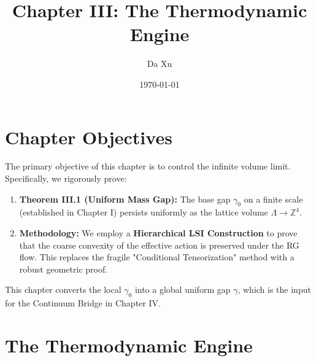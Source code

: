 \documentclass[11pt,a4paper]{report}
\title{Chapter III: The Thermodynamic Engine}
\author{Da Xu}
\date{\today}
\begin{document}
\maketitle

\chapter*{Chapter Objectives}
The primary objective of this chapter is to control the infinite volume limit. Specifically, we rigorously prove:
\begin{enumerate}
    \item \textbf{Theorem III.1 (Uniform Mass Gap):} The base gap $\gamma_0$ on a finite scale (established in Chapter I) persists uniformly as the lattice volume $\Lambda \to \mathbb{Z}^4$.
    \item \textbf{Methodology:} We employ a \textbf{Hierarchical LSI Construction} to prove that the coarse convexity of the effective action is preserved under the RG flow. This replaces the fragile "Conditional Tensorization" method with a robust geometric proof.
\end{enumerate}
This chapter converts the local $\gamma_0$ into a global uniform gap $\gamma$, which is the input for the Continuum Bridge in Chapter IV.

\tableofcontents


\chapter{The Thermodynamic Engine}



\appendix






\printbibliography[heading=subbibliography, title={References for Chapter 3}]
\end{document}
